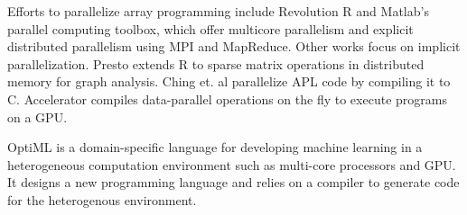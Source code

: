 Efforts to parallelize array programming include Revolution R \cite{rro} and
Matlab's parallel computing toolbox, which offer multicore parallelism and
explicit distributed parallelism using MPI and MapReduce. Other works focus
on implicit parallelization. Presto \cite{presto} extends R to sparse matrix
operations in distributed memory for graph
analysis. Ching et. al \cite{Ching12} parallelize APL code by
compiling it to C. Accelerator \cite{accelerator} compiles
data-parallel operations on the fly to execute programs on a GPU.

OptiML \cite{optiml} is a domain-specific language for developing machine
learning in a heterogeneous computation environment such as multi-core
processors and GPU. It designs a new programming language and relies on
a compiler to generate code for the heterogenous environment.
